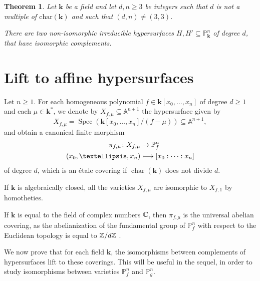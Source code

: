 \documentclass[11pt]{article}
\newcommand\mto{\mathchoice{\longmapsto}{\mapsto}{\mapsto}{\mapsto}}
\newtheorem{maintheorem}{Theorem}
\theoremstyle{definition}
\newcommand\A{{\mathbb A}}\let\AA\A
\renewcommand\k{{\mathbf k}}
\newcommand\p{{\mathbb P}}\let\PP\p
\newcommand{\kk}{\mathbf{k}}
\DeclareMathOperator{\car}{char}
\DeclareMathOperator{\Spec}{Spec}
\begin{document}
\begin{maintheorem}\label{34and43}
Let $\kk$ be a field and let $d,n \ge 3$ be integers such that $d$ is not a multiple of $\mathrm{char}(\kk)$ and such that $(d,n)\neq (3,3)$.

There are two non-isomorphic irreducible hypersurfaces $H,H'\subseteq \p^n_\k$ of degree $d$, that have isomorphic complements.
\end{maintheorem}



\section{Lift to affine hypersurfaces}
Let $n\geq 1$. For each homogeneous polynomial $f\in \kk[x_0,\ldots,x_n]$ of degree $d\ge 1$ and each $\mu\in \k^*$, we denote by $X_{f,\mu}\subseteq \A^{n+1}$ the hypersurface given by
\[
X_{f,\mu}=\Spec(\k[x_0,\ldots,x_n]/(f-\mu)) \subseteq \AA^{n+1},
\]
and obtain a canonical finite morphism
\begin{align*}
\pi_{f,\mu}\colon X_{f, \mu}&\to \p^n_f\\
(x_0,\ldots,x_n)&\mto [x_0:\cdots:x_n]
\end{align*}
of degree $d$, which is an étale covering if $\car(\kk)$ does not divide $d$.

If $\kk$ is algebraically closed, all the varieties $X_{f,\mu}$ are isomorphic to $X_{f,1}$ by homotheties.

If $\k$ is equal to the field of complex numbers ${\mathbb C}$, then $\pi_{f,\mu}$
is the universal abelian covering, as the abelianization of the
fundamental group of $\p^n_f$ with respect to the Euclidean topology is equal to ${\mathbb Z} / d {\mathbb Z}$ \cite[Prop.\,2.3]{Li2005Lectures-on-topolo}.

We now prove that for each field $\kk$, the isomorphisms between complements of hypersurfaces lift to these coverings. This will be useful in the sequel, in order to study isomorphisms between varieties $\p^n_f$ and $\p^n_g$.
\end{document}

